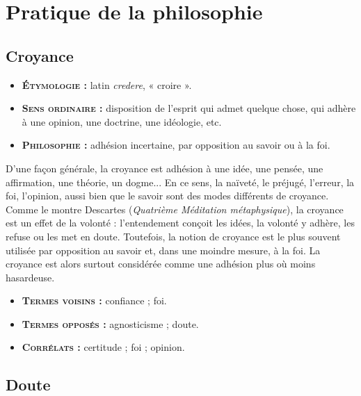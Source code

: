 \section{Pratique de la philosophie}

\subsection{Croyance}

{\footnotesize
\begin{itemize}[leftmargin=1cm, label=, itemsep=1pt]
\item {\bf \textsc{Étymologie} :} latin {\it credere}, « croire ».
\item {\bf \textsc{Sens ordinaire} :} disposition
 de l'esprit qui admet quelque
chose, qui adhère à une opinion,
une doctrine, une idéologie, etc.
\item {\bf \textsc{Philosophie} :} adhésion incertaine,
par opposition au savoir ou à la foi.
\end{itemize}
}

D'une façon générale, la croyance est
adhésion à une idée, une pensée, une
affirmation, une théorie, un dogme... En
ce sens, la naïveté, le préjugé, l'erreur,
la foi, l’opinion, aussi bien que le
savoir sont des modes différents de
croyance. Comme le montre Descartes
({\it Quatrième Méditation métaphysique}),
la croyance est un effet de la volonté :
l'entendement conçoit les idées, la
volonté y adhère, les refuse ou les met
en doute. Toutefois, la notion de
croyance est le plus souvent utilisée par
opposition au savoir et, dans une
moindre mesure, à la foi. La croyance
est alors surtout considérée comme une
adhésion plus où moins hasardeuse.

{\footnotesize
\begin{itemize}[leftmargin=1cm, label=, itemsep=1pt]
\item {\bf \textsc{Termes voisins} :} confiance ; foi.
\item {\bf \textsc{Termes opposés} :} agnosticisme ;
doute.
\item {\bf \textsc{Corrélats} :}  certitude ;
foi ; opinion.
\end{itemize}
}


\subsection{Doute}

